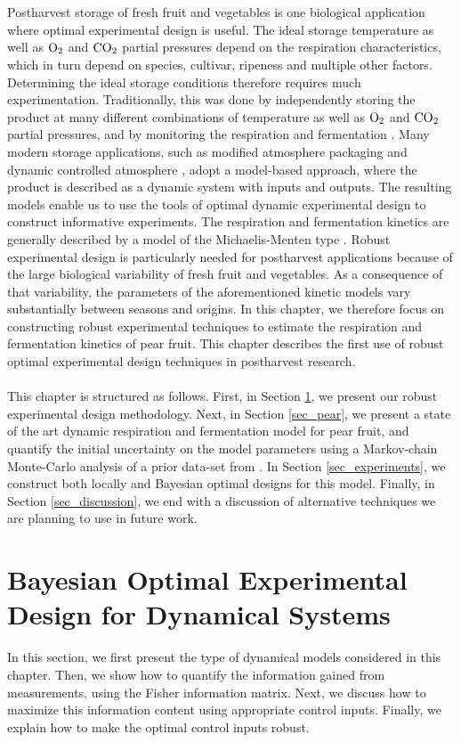 \\
\\
Postharvest storage of fresh fruit and vegetables is one biological application where optimal experimental design is useful. The ideal storage temperature as well as $\text{O}_2$ and $\text{CO}_2$ partial pressures depend on the respiration characteristics, which in turn depend on species, cultivar, ripeness and multiple other factors. Determining the ideal storage conditions therefore requires much experimentation. Traditionally, this was done by independently storing the product at many different combinations of temperature as well as $\text{O}_2$ and $\text{CO}_2$ partial pressures, and by monitoring the respiration and fermentation \parencite{saltveit}. Many modern storage applications, such as modified atmosphere packaging \parencite{fonseca} and dynamic controlled atmosphere \parencite{bessemans}, adopt a model-based approach, where the product is described as a dynamic system with inputs and outputs. The resulting models enable us to use the tools of optimal dynamic experimental design to construct informative experiments. The respiration and fermentation kinetics are generally described by a model of the Michaelis-Menten type \parencite{hertog}. Robust experimental design is particularly needed for postharvest applications because of the large biological variability of fresh fruit and vegetables. As a consequence of that variability, the parameters of the aforementioned kinetic models vary substantially between seasons and origins. In this chapter, we therefore focus on constructing robust experimental techniques to estimate the respiration and fermentation kinetics of pear fruit. This chapter describes the first use of robust optimal experimental design techniques in postharvest research.
\\
\\
This chapter is structured as follows. First, in Section \ref{sec_OED}, we present our robust experimental design methodology. Next, in Section \ref{sec_pear}, we present a state of the art dynamic respiration and fermentation model for pear fruit, and quantify the initial uncertainty on the model parameters using a Markov-chain Monte-Carlo analysis of a prior data-set from \textcite{ho}. In Section \ref{sec_experiments}, we construct both locally and Bayesian optimal designs for this model. Finally, in Section \ref{sec_discussion}, we end with a discussion of alternative techniques we are planning to use in future work.
\section{Bayesian Optimal Experimental Design for Dynamical Systems}
\label{sec_OED}
In this section, we first present the type of dynamical models considered in this chapter. Then, we show how to quantify the information gained from measurements, using the Fisher information matrix. Next, we discuss how to maximize this information content using appropriate control inputs. Finally, we explain how to make the optimal control inputs robust.
